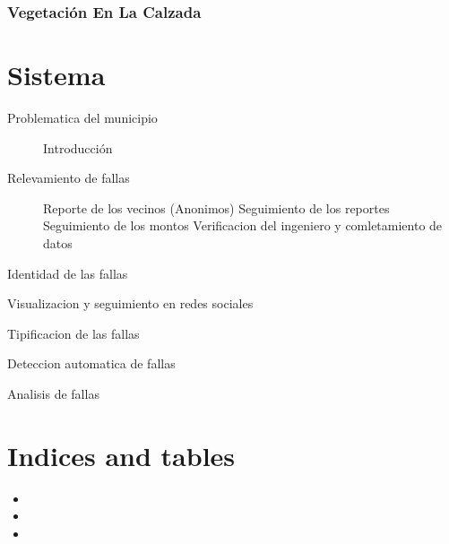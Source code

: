\documentclass[letterpaper,10pt,spanish]{sphinxmanual}
\begin{document}
\subsection{Vegetación En La Calzada}
\label{patologia/articulados:vegetacion-en-la-calzada}

\chapter{Sistema}
\label{index:sistema}\begin{description}
\item[{Problematica del municipio}] \leavevmode
Introducción

\item[{Relevamiento de fallas}] \leavevmode
Reporte de los vecinos (Anonimos)
Seguimiento de los reportes
Seguimiento de los montos
Verificacion del ingeniero y comletamiento de datos

\end{description}

Identidad de las fallas

Visualizacion y seguimiento en redes sociales

Tipificacion de las fallas

Deteccion automatica de fallas

Analisis de fallas


\chapter{Indices and tables}
\label{index::doc}\label{index:indices-and-tables}\begin{itemize}
\item {} 

\item {} 

\item {} 

\end{itemize}



\renewcommand{\indexname}{Índice}
\printindex
\end{document}
